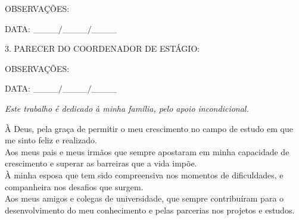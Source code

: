 \begin{folhadeaprovacao}
  	 OBSERVAÇÕES:
  		  		
  		  		 DATA: \_\_\_\_$/$\_\_\_\_$/$\_\_\_\_ \tab {}
  		\par
  		\vspace*{0.5cm}
  		 \ABNTEXchapterfont\large   3. PARECER DO COORDENADOR DE ESTÁGIO:
  		   		\normalsize 
  		
  		 OBSERVAÇÕES: 

  		 DATA: \_\_\_\_$/$\_\_\_\_$/$\_\_\_\_ \tab {}
  		 
   \begin{center}
    \vspace*{0.1cm}
    {\large\imprimirlocal}
    \par
    {\large\imprimirdata}
    \vspace*{0.5cm}
  \end{center}
  
\end{folhadeaprovacao}

\begin{dedicatoria}
   \vspace*{\fill}
   \centering
   \noindent
   \textit{ Este trabalho é dedicado à minha família, pelo apoio incondicional.} \vspace*{\fill}
\end{dedicatoria}

\begin{agradecimentos}
À Deus, pela graça de permitir o meu crescimento no campo de estudo em que me sinto feliz e realizado. \\

Aos meus pais e meus irmãos que sempre apostaram em minha capacidade de crescimento e superar as barreiras que a vida impõe.\\

À minha esposa que tem sido compreensiva nos momentos de dificuldades, e companheira nos desafios que surgem.\\

Aos meus amigos e colegas de universidade, que sempre contribuíram para o desenvolvimento do meu conhecimento e pelas parcerias nos projetos e estudos.


\end{agradecimentos}

